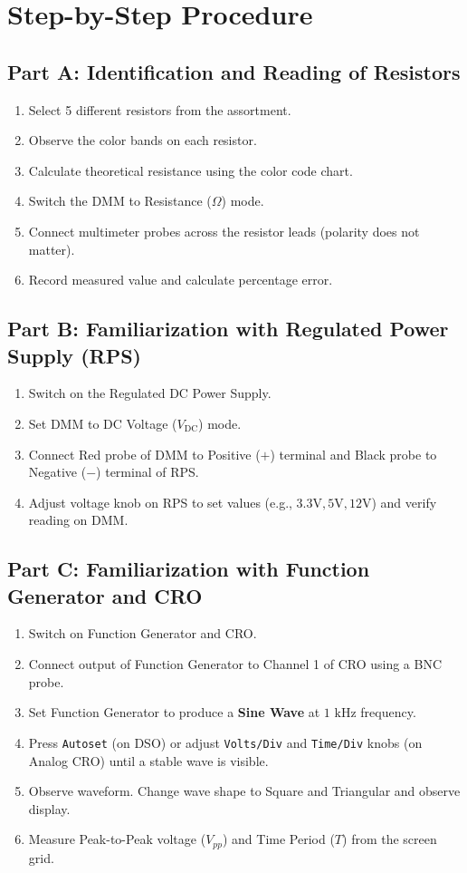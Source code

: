 \section{Step-by-Step Procedure}

\subsection{Part A: Identification and Reading of Resistors}
\begin{enumerate}
    \item Select 5 different resistors from the assortment.
    \item Observe the color bands on each resistor.
    \item Calculate theoretical resistance using the color code chart.
    \item Switch the DMM to Resistance ($\Omega$) mode.
    \item Connect multimeter probes across the resistor leads (polarity does not matter).
    \item Record measured value and calculate percentage error.
\end{enumerate}

\subsection{Part B: Familiarization with Regulated Power Supply (RPS)}
\begin{enumerate}
    \item Switch on the Regulated DC Power Supply.
    \item Set DMM to DC Voltage ($V_{\text{DC}}$) mode.
    \item Connect Red probe of DMM to Positive ($+$) terminal and Black probe to Negative ($-$) terminal of RPS.
    \item Adjust voltage knob on RPS to set values (e.g., $3.3\text{V}, 5\text{V}, 12\text{V}$) and verify reading on DMM.
\end{enumerate}

\subsection{Part C: Familiarization with Function Generator and CRO}
\begin{enumerate}
    \item Switch on Function Generator and CRO.
    \item Connect output of Function Generator to Channel 1 of CRO using a BNC probe.
    \item Set Function Generator to produce a \textbf{Sine Wave} at $1\text{ kHz}$ frequency.
    \item Press \texttt{Autoset} (on DSO) or adjust \texttt{Volts/Div} and \texttt{Time/Div} knobs (on Analog CRO) until a stable wave is visible.
    \item Observe waveform. Change wave shape to Square and Triangular and observe display.
    \item Measure Peak-to-Peak voltage ($V_{pp}$) and Time Period ($T$) from the screen grid.
\end{enumerate}

